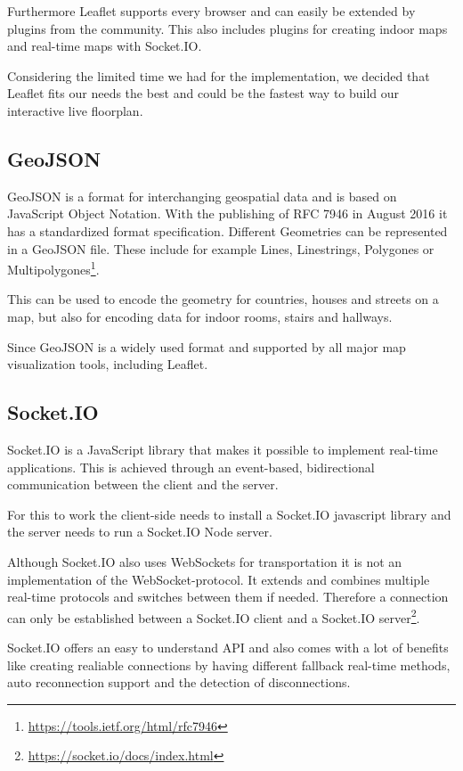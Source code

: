 Furthermore Leaflet supports every browser and can easily be extended by plugins from the community.
This also includes plugins for creating indoor maps and real-time maps with Socket.IO. 

Considering the limited time we had for the implementation, we decided that Leaflet fits our needs the best and could be the fastest way to build our interactive live floorplan.

\subsection{GeoJSON}
\label{GeoJSON}

GeoJSON is a format for interchanging geospatial data and is based on JavaScript Object Notation. With the publishing of RFC 7946 in August 2016 it has a standardized format specification.
Different Geometries can be represented in a GeoJSON file. These include for example Lines, Linestrings, Polygones or Multipolygones\footnote{\url{https://tools.ietf.org/html/rfc7946}}. 

This can be used to encode the geometry for countries, houses and streets on a map, but also for encoding data for indoor rooms, stairs and hallways.

Since GeoJSON is a widely used format and supported by all major map visualization tools, including Leaflet.

\subsection{Socket.IO}
\label{Socket.IO}

Socket.IO is a JavaScript library that makes it possible to implement real-time applications. This is achieved through an event-based, bidirectional communication between the client and the server. 

For this to work the client-side needs to install a Socket.IO javascript library and the server needs to run a Socket.IO Node server. 

Although Socket.IO also uses WebSockets for transportation it is not an implementation of the WebSocket-protocol. It extends and combines multiple real-time protocols and switches between them if needed. Therefore a connection can only be established between a Socket.IO client and a Socket.IO server\footnote{\url{https://socket.io/docs/index.html}}.

Socket.IO offers an easy to understand API and also comes with a lot of benefits like creating realiable connections by having different fallback real-time methods, auto reconnection support and the detection of disconnections.

